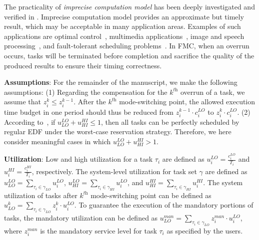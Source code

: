 \documentclass[10pt,journal,compsoc]{IEEEtran}
\begin{document}
The practicality of \textit{imprecise computation model} has been deeply investigated and verified in \cite{IMCR3}. Imprecise computation model provides an approximate but timely result, which may be acceptable in many application areas. Examples of such applications are optimal control~\cite{RateIMC}, multimedia applications~\cite{Rajkumar1997A}, image and speech processing~\cite{Feng}, and fault-tolerant scheduling problems~\cite{Han2003A}.
In FMC, when an overrun occurs, \lo tasks will be terminated before completion and sacrifice the quality of the produced results to ensure their timing correctness.

\noindent\textbf{Assumptions}: For the remainder of the manuscript, we make the following assumptions: (1) Regarding the compensation for the $k^{\textit{th}}$ overrun of a \hi task, we assume that $z_i^k\le{z_i^{k-1}}$. After the $k^{\textit{th}}$ mode-switching point, the allowed execution time budget in one period should thus be reduced from $z_i^{k-1}\cdot{c_i^{LO}}$ to $z_i^{k}\cdot{c_i^{LO}}$. 
(2) According to~\cite{Baruah2012}, if $u_{LO}^{LO}+u_{HI}^{HI}\le{1}$, then all tasks can be perfectly scheduled by regular EDF under the worst-case reservation strategy. Therefore, we here consider meaningful cases in which $u_{LO}^{LO}+u_{HI}^{HI}>{1}$. 

\noindent\textbf{Utilization}: Low and high utilization for a task $\tau_i$ are defined as $u_i^{LO}=\frac{c_i^{LO}}{T_i}$ and $u_i^{HI}=\frac{c_i^{HI}}{T_i}$, respectively. The system-level utilization for task set $\gamma$ are defined as $u_{LO}^{LO}=\sum_{\tau_i\in{\gamma_{LO}}}u_i^{LO}$, $u_{HI}^{LO}=\sum_{\tau_i\in{\gamma_{HI}}}u_i^{LO}$, and $u_{HI}^{HI}=\sum_{\tau_i\in{\gamma_{HI}}}u_i^{HI}$. The system utilization of \lo tasks after $k^{\textit{th}}$ mode-switching point can be defined as $u_{LO}^{k}=\sum_{\tau_i\in{\gamma_{LO}}}z_i^k\cdot{}u_i^{LO}$. To guarantee the execution of the mandatory portions of \lo tasks, the mandatory utilization can be defined as $u_{LO}^{man}=\sum_{\tau_i\in{\gamma_{LO}}}z_{i}^{man}\cdot{}u_i^{LO}$, where $z_{i}^{man}$ is the mandatory service level for task $\tau_i$ as specified by the users. 
\end{document}
